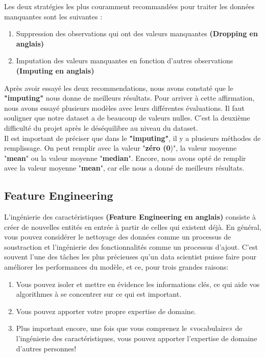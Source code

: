 \documentclass[12pt, french]{article}
\begin{document}
Les deux stratégies les plus couramment recommandées pour traiter les données manquantes sont les suivantes :
\begin{enumerate}
\item Suppression des observations qui ont des valeurs manquantes \textbf{(Dropping en anglais)}
\item Imputation des valeurs manquantes en fonction d'autres observations \textbf{(Imputing en anglais)}
\end{enumerate}

Après avoir essayé les deux recommendations, nous avons constaté que le \textbf{"imputing"} nous donne de meilleurs résultats. Pour arriver à cette affirmation, nous avons essayé plusieurs modèles avec leurs différentes évaluations. Il faut souligner que notre dataset a de beaucoup de valeurs nulles. C'est la deuxième difficulté du projet après le déséquilibre au niveau du dataset. \\

Il est important de préciser que dans le  \textbf{"imputing"}, il y a plusieurs méthodes de remplissage. On peut remplir avec la valeur "\textbf{zéro (0})", la valeur moyenne "\textbf{mean}" ou la valeur moyenne "\textbf{median}". Encore, nous avons opté de remplir avec la valeur moyenne "\textbf{mean}", car elle nous a donné de meilleurs résultats. 


\subsection{Feature Engineering}

L'ingénierie des caractéristiques \textbf{(Feature Engineering en anglais)} consiste à créer de nouvelles entités en entrée à partir de celles qui existent déjà. En général, vous pouvez considérer le nettoyage des données comme un processus de soustraction et l'ingénierie des fonctionnalités comme un processus d'ajout. C'est souvent l'une des tâches les plus précieuses qu'un data scientist puisse faire pour améliorer les performances du modèle, et ce, pour trois grandes raisons:

\begin{enumerate}
\item Vous pouvez isoler et mettre en évidence les informations clés, ce qui aide vos algorithmes à se concentrer sur ce qui est important.
\item Vous pouvez apporter votre propre expertise de domaine.
\item Plus important encore, une fois que vous comprenez le «vocabulaire» de l'ingénierie des caractéristiques, vous pouvez apporter l'expertise de domaine d'autres personnes!
\end{enumerate}
\end{document}
